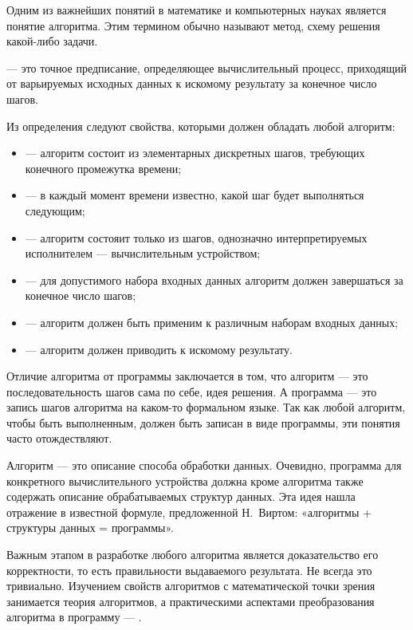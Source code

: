 Одним из важнейших понятий в математике и компьютерных науках является
понятие алгоритма. Этим термином обычно называют метод, схему решения
какой-либо задачи.

\begin{defn}
   — это точное предписание, определяющее
  вычислительный процесс, приходящий от варьируемых исходных данных к
  искомому результату за конечное число шагов.
\end{defn}

Из определения следуют свойства, которыми должен обладать любой
алгоритм:

\begin{itemize}
\item {} — алгоритм состоит из
  элементарных дискретных шагов, требующих конечного промежутка
  времени;
\item {} — в каждый
  момент времени известно, какой шаг будет выполняться следующим;
\item {} — алгоритм состояит только из
  шагов, однозначно интерпретируемых исполнителем — вычислительным
  устройством;
\item {} — для допустимого набора входных
  данных алгоритм должен завершаться за конечное число шагов;
\item {} — алгоритм должен быть
  применим к различным наборам входных данных;
\item {} — алгоритм должен
  приводить к искомому результату.
\end{itemize}

Отличие алгоритма от программы заключается в том, что алгоритм — это
последовательность шагов сама по себе, идея решения. А программа — это
запись шагов алгоритма на каком-то формальном языке. Так как любой
алгоритм, чтобы быть выполненным, должен быть записан в виде
программы, эти понятия часто отождествляют.

Алгоритм — это описание способа обработки данных. Очевидно, программа
для конкретного вычислительного устройства должна кроме алгоритма
также содержать описание обрабатываемых структур данных. Эта идея
нашла отражение в известной формуле, предложенной Н.~Виртом:
«алгоритмы + структуры данных = программы».

Важным этапом в разработке любого алгоритма является доказательство
его корректности, то есть правильности выдаваемого результата. Не
всегда это тривиально. Изучением свойств алгоритмов с математической
точки зрения занимается теория алгоритмов, а практическими аспектами
преобразования алгоритма в программу — .

